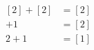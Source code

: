 \documentclass[preview]{standalone}
\begin{document}
\begin{align*}
\begin{aligned}[2] + [2] &= [2] \\[1] + 1 &= [2] \\2 + 1 &= [1]\end{aligned}
\end{align*}
\end{document}
